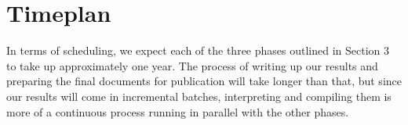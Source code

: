 \documentclass[a4paper]{article}
\begin{document}
\section{Timeplan}
In terms of scheduling, we expect each of the three phases outlined in Section 3 to take up approximately one year. The process of writing up our results and preparing the final documents for publication will take longer than that, but since our results will come in incremental batches, interpreting and compiling them is more of a continuous process running in parallel with the other phases.





{}
%

\end{document}
